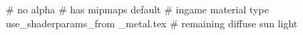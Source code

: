 # no alpha
# has mipmaps
default			 # ingame material type
use_shaderparams_from
_metal.tex		 # remaining diffuse sun light



